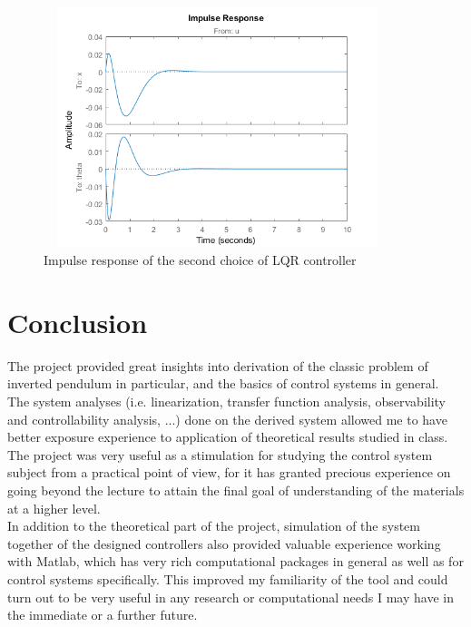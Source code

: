 \documentclass [12pt,letterpaper]{exam}
\begin{document}
\begin{figure}[H]
  \centering
    \includegraphics[width=10.15cm, height=7cm]{lqr2_impulse} 
  \caption{Impulse response of the second choice of LQR controller}
  \label{fig:lqr2_impulse}
\end{figure}



\newpage
\section{Conclusion}
The project provided great insights into derivation of the classic problem of inverted pendulum in particular, and the basics of control systems in general. The system analyses (i.e. linearization, transfer function analysis, observability and controllability analysis, ...) done on the derived system allowed me to have better exposure experience to application of theoretical results studied in class. The project was very useful as a stimulation for studying the control system subject from a practical point of view, for it has granted precious experience on going beyond the lecture to attain the final goal of understanding of the materials at a higher level. \\
In addition to the theoretical part of the project, simulation of the system together of the designed controllers also provided valuable experience working with Matlab, which has very rich computational packages in general as well as for control systems specifically. This improved my familiarity of the tool and could turn out to be very useful in any research or computational needs I may have in the immediate or a further future.
\newpage
\end{document}
